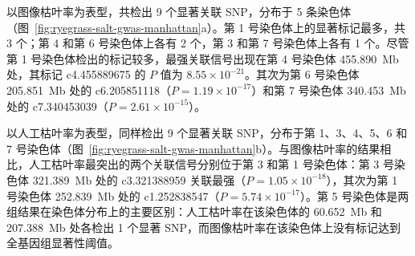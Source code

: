 以图像枯叶率为表型，共检出 9 个显著关联 SNP，分布于 5 条染色体（图~\ref{fig:ryegrass-salt-gwas-manhattan}a）。第 1 号染色体上的显著标记最多，共 3 个；第 4 和第 6 号染色体上各有 2 个，第 3 和第 7 号染色体上各有 1 个。尽管第 1 号染色体检出的标记较多，最强关联信号出现在第 4 号染色体 455.890~Mb 处，其标记 c4.455889675 的 \(P\) 值为 \(8.55\times10^{-21}\)。其次为第 6 号染色体 205.851~Mb 处的 c6.205851118（\(P=1.19\times10^{-17}\)）和第 7 号染色体 340.453~Mb 处的 c7.340453039（\(P=2.61\times10^{-15}\)）。\par
以人工枯叶率为表型，同样检出 9 个显著关联 SNP，分布于第 1、3、4、5、6 和 7 号染色体（图~\ref{fig:ryegrass-salt-gwas-manhattan}b）。与图像枯叶率的结果相比，人工枯叶率最突出的两个关联信号分别位于第 3 和第 1 号染色体：第 3 号染色体 321.389~Mb 处的 c3.321388959 关联最强（\(P=1.05\times10^{-18}\)），其次为第 1 号染色体 252.839~Mb 处的 c1.252838547（\(P=5.74\times10^{-17}\)）。第 5 号染色体是两组结果在染色体分布上的主要区别：人工枯叶率在该染色体的 60.652~Mb 和 207.388~Mb 处各检出 1 个显著 SNP，而图像枯叶率在该染色体上没有标记达到全基因组显著性阈值。